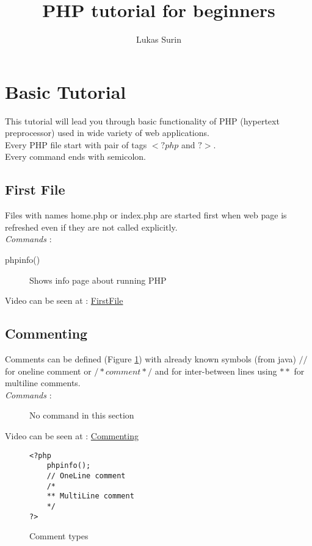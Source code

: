 \documentclass{article}
\title{PHP tutorial for beginners}
\author{Lukas Surin}
\begin{document}
\maketitle

\section{Basic Tutorial}
This tutorial will lead you through basic functionality of PHP (hypertext preprocessor) used in wide variety of web applications. \\
Every PHP file start with pair of tags $<?php$ and $?>$. \\
Every command ends with semicolon. \\

\subsection{First File}
Files with names home.php or index.php are started first when web page is refreshed even if they are not called explicitly. \\
\textit{Commands} : 
\begin{description}
\item[\hspace{1cm} phpinfo()] Shows info page about running PHP 
\end{description}
Video can be seen at : \href{http://youtu.be/QRmmISj6Rrw}{FirstFile}

\subsection{Commenting}
Comments can be defined (Figure \hyperref[commenting]{\ref{commenting}}) with already known symbols (from java) $//$ for oneline comment or $/* comment */$ and for inter-between lines using $**$ for multiline comments.  \\
\textit{Commands} : 
\begin{description}
\item[\hspace{1cm}] No command in this section
\end{description}
Video can be seen at : \href{http://youtu.be/KZecj4u4Scw}{Commenting}

\begin{figure}[h]
\lstset{language=PHP}
\begin{lstlisting}
<?php
	phpinfo();
	// OneLine comment
	/*
	** MultiLine comment
	*/	
?>
\end{lstlisting}
\caption{Comment types \label{commenting}}
\end{figure}
\end{document}

